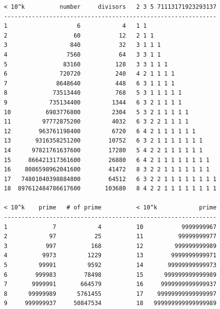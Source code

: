 \documentclass[landscape, 8pt, a4paper, twocolumn]{extarticle} %
\begin{document}
\begin{verbatim}
< 10^k          number     divisors   2 3 5 71113171923293137
-------------------------------------------------------------
1                    6            4   1 1
2                   60           12   2 1 1
3                  840           32   3 1 1 1
4                 7560           64   3 3 1 1
5                83160          128   3 3 1 1 1
6               720720          240   4 2 1 1 1 1
7              8648640          448   6 3 1 1 1 1
8             73513440          768   5 3 1 1 1 1 1
9            735134400         1344   6 3 2 1 1 1 1
10          6983776800         2304   5 3 2 1 1 1 1 1
11         97772875200         4032   6 3 2 2 1 1 1 1
12        963761198400         6720   6 4 2 1 1 1 1 1 1
13       9316358251200        10752   6 3 2 1 1 1 1 1 1 1
14      97821761637600        17280   5 4 2 2 1 1 1 1 1 1
15     866421317361600        26880   6 4 2 1 1 1 1 1 1 1 1
16    8086598962041600        41472   8 3 2 2 1 1 1 1 1 1 1
17   74801040398884800        64512   6 3 2 2 1 1 1 1 1 1 1 1
18  897612484786617600       103680   8 4 2 2 1 1 1 1 1 1 1 1

< 10^k    prime   # of prime          < 10^k            prime
-------------------------------------------------------------
1             7            4          10           9999999967
2            97           25          11          99999999977
3           997          168          12         999999999989
4          9973         1229          13        9999999999971
5         99991         9592          14       99999999999973
6        999983        78498          15      999999999999989
7       9999991       664579          16     9999999999999937
8      99999989      5761455          17    99999999999999997
9     999999937     50847534          18   999999999999999989
\end{verbatim}
\end{document}
